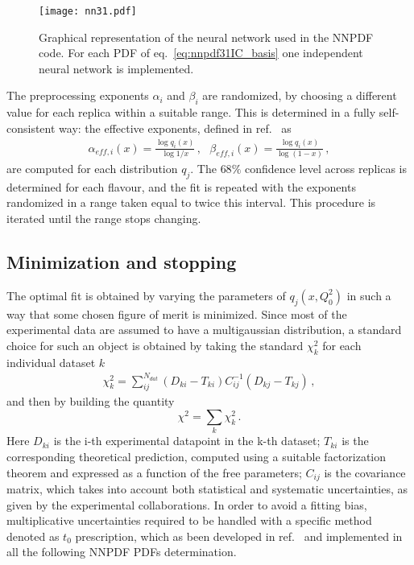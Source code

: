 \begin{figure}[htb]     
	\begin{center}
		\texttt{[image: nn31.pdf]}
	\end{center}
    \caption{Graphical representation of the neural network used in the NNPDF code.
    For each PDF of eq.~\eqref{eq:nnpdf31IC_basis} one independent neural network is implemented.}
	\label{nn}                 
\end{figure}
The preprocessing exponents $\alpha_i$ and $\beta_i$ are randomized, by choosing a different value for each replica
within a suitable range. This is determined in a fully self-consistent way: the effective exponents, defined in
ref.~\cite{Ball:2014uwa} as 
\begin{align}
    \label{eq:effective_exp}
    \alpha_{eff,i}\left(x\right) = \frac{\log q_i\left(x\right)}{\log 1/x}\,, \,\,\,\,
    \beta_{eff,i}\left(x\right) = \frac{\log q_i\left(x\right)}{\log\left(1-x\right)}\,,
\end{align}
are computed for each distribution $q_j$. The $68\%$ confidence level across replicas
is determined for each flavour, and the fit is repeated with the exponents randomized in a range taken equal to twice this 
interval. This procedure is iterated until the range stops changing.

\subsection{Minimization and stopping}
\label{sec:minimization}
The optimal fit is obtained by varying the parameters of $q_j\left(x,Q_0^2\right)$  in such a way that 
some chosen figure of merit is minimized. 
Since most of the experimental data are assumed to have a multigaussian
distribution, a standard choice for such an object is obtained by taking the standard $\chi^2_k $ for each individual 
dataset $k$
\begin{align}
    \label{eq:chi2}
    \chi^2_k 
    =\sum_{ij}^{N_{dat}}\left(D_{ki}-T_{ki}\right)C_{ij}^{-1}\left(D_{kj}-T_{kj}\right)\,,
\end{align}
and then by building the quantity
\begin{equation}
\label{tot chi2}
\chi^2=\sum_k \chi^2_k\,.
\end{equation}
Here $D_{ki}$ is the i-th experimental datapoint in the k-th dataset; $T_{ki}$ is the corresponding 
theoretical prediction, computed using a suitable factorization theorem and 
expressed as a function of the free parameters; 
$C_{ij}$ is the covariance matrix, which takes into account both statistical and systematic uncertainties,
as given by the experimental collaborations.
In order to avoid a fitting bias, multiplicative uncertainties required to be handled with a specific method
denoted as $t_0$ prescription, which as been developed in ref.~\cite{Ball:2009qv} and implemented in all the following
NNPDF PDFs determination.

